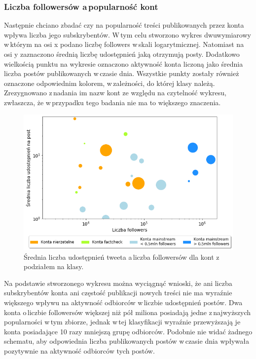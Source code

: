 \subsubsection{Liczba followersów a\,popularność kont}
Następnie chciano zbadać czy na popularność treści publikowanych przez konta wpływa liczba jego subskrybentów. W\,tym celu stworzono wykres dwuwymiarowy w\,którym na osi x podano liczbę followers w\,skali logarytmicznej. Natomiast na osi y zaznaczono średnią liczbę udostępnień jaką otrzymują posty. Dodatkowo wielkością punktu na wykresie oznaczono aktywność konta liczoną jako średnia liczba postów publikowanych w\,czasie dnia. Wszystkie punkty zostały również oznaczone odpowiednim kolorem, w\,zależności, do której klasy należą. Zrezygnowano z\,nadania im nazw kont ze względu na czytelność wykresu, zwłaszcza, że w\,przypadku tego badania nie ma to większego znaczenia. 
\begin{figure}[!h]
	\centering \includegraphics[width=0.95\linewidth]{img/results/retweetsvsfollowers2.png}
	\caption{Średnia liczba udostępnień tweeta a\,liczba followersów dla kont z\,podziałem na klasy.} \label{fig:retweets-vs-followers}
\end{figure}
\par

Na podstawie stworzonego wykresu można wyciągnąć wnioski, że ani liczba subskrybentów konta ani częstość publikacji nowych treści nie ma wyraźnie większego wpływu na aktywność odbiorców w\,liczbie udostępnień postów. Dwa konta o\,liczbie followersów większej niż pół miliona posiadają jedne z\,najwyższych popularności w\,tym zbiorze, jednak w\,tej klasyfikacji wyraźnie przewyższają je konta posiadające 10 razy mniejszą grupę odbiorców.  Podobnie nie widać żadnego schematu, aby odpowiednia liczba publikowanych postów w\,czasie dnia wpływała pozytywnie na aktywność odbiorców tych postów. 

